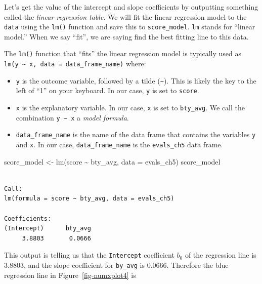 \documentclass[
  letterpaper,
  DIV=11,
  numbers=noendperiod]{scrreprt}
\newenvironment{Shaded}{\begin{snugshade}}{\end{snugshade}}
\newcommand{\AttributeTok}[1]{\textcolor[rgb]{0.40,0.45,0.13}{#1}}
\newcommand{\FunctionTok}[1]{\textcolor[rgb]{0.28,0.35,0.67}{#1}}
\newcommand{\NormalTok}[1]{\textcolor[rgb]{0.00,0.23,0.31}{#1}}
\newcommand{\OtherTok}[1]{\textcolor[rgb]{0.00,0.23,0.31}{#1}}
\newcommand{\SpecialCharTok}[1]{\textcolor[rgb]{0.37,0.37,0.37}{#1}}
\theoremstyle{definition}
\theoremstyle{remark}
\begin{document}
Let's get the value of the intercept and slope coefficients by
outputting something called the \emph{linear regression table}. We will
fit the linear regression model to the \texttt{data} using the
\texttt{lm()} function and save this to \texttt{score\_model}.
\texttt{lm} stands for ``linear model.'' When we say ``fit'', we are
saying find the best fitting line to this data.

The \texttt{lm()} function that ``fits'' the linear regression model is
typically used as
\texttt{lm(y\ \textasciitilde{}\ x,\ data\ =\ data\_frame\_name)} where:

\begin{itemize}
\item
  \texttt{y} is the outcome variable, followed by a tilde
  (\texttt{\textasciitilde{}}). This is likely the key to the left of
  ``1'' on your keyboard. In our case, \texttt{y} is set to
  \texttt{score}.
\item
  \texttt{x} is the explanatory variable. In our case, \texttt{x} is set
  to \texttt{bty\_avg}. We call the combination
  \texttt{y\ \textasciitilde{}\ x} a \emph{model formula}.
\item
  \texttt{data\_frame\_name} is the name of the data frame that contains
  the variables \texttt{y} and \texttt{x}. In our case,
  \texttt{data\_frame\_name} is the \texttt{evals\_ch5} data frame.
\end{itemize}

\begin{Shaded}
\begin{Highlighting}[]
\NormalTok{score\_model }\OtherTok{\textless{}{-}} \FunctionTok{lm}\NormalTok{(score }\SpecialCharTok{\textasciitilde{}}\NormalTok{ bty\_avg, }\AttributeTok{data =}\NormalTok{ evals\_ch5)}
\NormalTok{score\_model}
\end{Highlighting}
\end{Shaded}

\begin{verbatim}

Call:
lm(formula = score ~ bty_avg, data = evals_ch5)

Coefficients:
(Intercept)      bty_avg  
     3.8803       0.0666  
\end{verbatim}

This output is telling us that the \texttt{Intercept} coefficient
\(b_0\) of the regression line is 3.8803, and the slope coefficient for
\texttt{by\_avg} is 0.0666. Therefore the blue regression line in
Figure~\ref{fig-numxplot4} is
\end{document}
